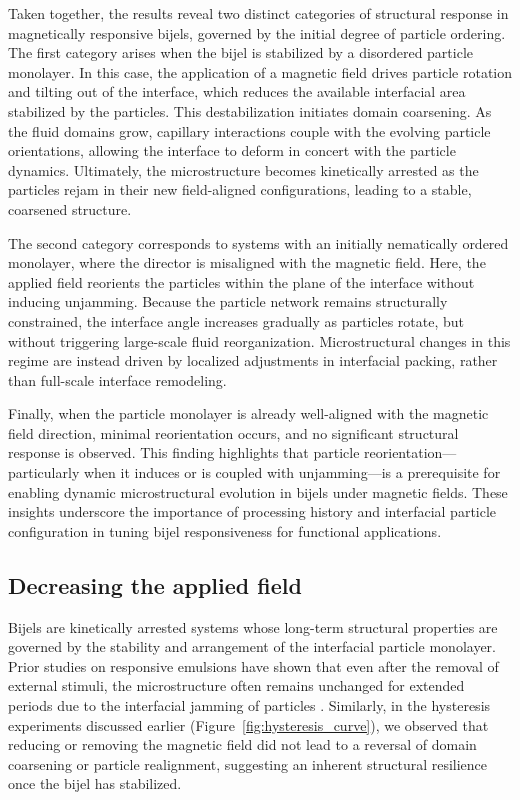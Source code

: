 Taken together, the results reveal two distinct categories of structural response in magnetically responsive bijels, governed by the initial degree of particle 
ordering. The first category arises when the bijel is stabilized by a disordered particle monolayer. In this case, the application of a magnetic field drives 
particle rotation and tilting out of the interface, which reduces the available interfacial area stabilized by the particles. This destabilization initiates 
domain coarsening. As the fluid domains grow, capillary interactions couple with the evolving particle orientations, allowing the interface to deform in concert 
with the particle dynamics. Ultimately, the microstructure becomes kinetically arrested as the particles rejam in their new field-aligned configurations, leading 
to a stable, coarsened structure.

The second category corresponds to systems with an initially nematically ordered monolayer, where the director is misaligned with the magnetic field. Here, the 
applied field reorients the particles within the plane of the interface without inducing unjamming. Because the particle network remains structurally constrained, 
the interface angle increases gradually as particles rotate, but without triggering large-scale fluid reorganization. Microstructural changes in this regime are 
instead driven by localized adjustments in interfacial packing, rather than full-scale interface remodeling.  

Finally, when the particle monolayer is already well-aligned with the magnetic field direction, minimal reorientation occurs, and no significant structural 
response is observed. This finding highlights that particle reorientation—particularly when it induces or is coupled with unjamming—is a prerequisite for 
enabling dynamic microstructural evolution in bijels under magnetic fields. These insights underscore the importance of processing history and interfacial 
particle configuration in tuning bijel responsiveness for functional applications.

\subsection{Decreasing the applied field}
\label{decreasing-the-applied-field}

Bijels are kinetically arrested systems whose long-term structural properties are governed by the stability and arrangement 
of the interfacial particle monolayer. Prior studies on responsive emulsions have shown that even after the removal of external 
stimuli, the microstructure often remains unchanged for extended periods due to the interfacial 
jamming of particles \cite{cui_stabilizing_2013}. Similarly, in the hysteresis experiments 
discussed earlier (Figure~\ref{fig:hysteresis_curve}), we observed that reducing or removing the magnetic field did not 
lead to a reversal of domain coarsening or particle realignment, suggesting an inherent structural resilience once the bijel 
has stabilized.

